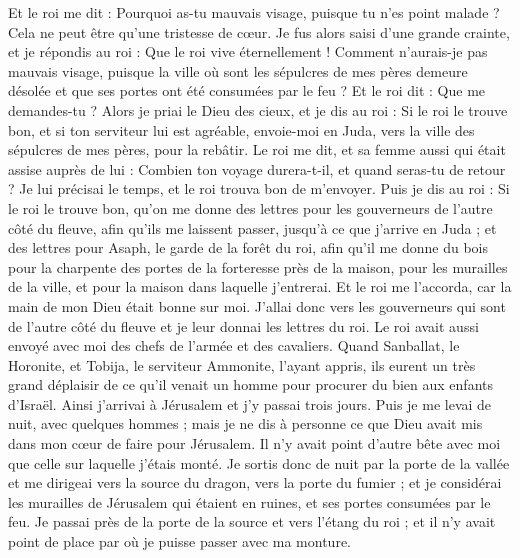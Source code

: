 \begin{multicols}{2}
Et le roi me dit : Pourquoi as-tu mauvais visage, puisque tu n'es point malade ? Cela ne peut être qu'une tristesse de cœur. Je fus alors saisi d'une grande crainte,
et je répondis au roi : Que le roi vive éternellement ! Comment n'aurais-je pas mauvais visage, puisque la ville où sont les sépulcres de mes pères demeure désolée et que ses portes ont été consumées par le feu ?
Et le roi dit : Que me demandes-tu ? Alors je priai le Dieu des cieux,
et je dis au roi : Si le roi le trouve bon, et si ton serviteur lui est agréable, envoie-moi en Juda, vers la ville des sépulcres de mes pères, pour la rebâtir.
Le roi me dit, et sa femme aussi qui était assise auprès de lui : Combien ton voyage durera-t-il, et quand seras-tu de retour ? Je lui précisai le temps, et le roi trouva bon de m'envoyer.
Puis je dis au roi : Si le roi le trouve bon, qu'on me donne des lettres pour les gouverneurs de l'autre côté du fleuve, afin qu'ils me laissent passer, jusqu'à ce que j'arrive en Juda ;
et des lettres pour Asaph, le garde de la forêt du roi, afin qu'il me donne du bois pour la charpente des portes de la forteresse près de la maison, pour les murailles de la ville, et pour la maison dans laquelle j'entrerai. Et le roi me l'accorda, car la main de mon Dieu était bonne sur moi.
J'allai donc vers les gouverneurs qui sont de l'autre côté du fleuve et je leur donnai les lettres du roi. Le roi avait aussi envoyé avec moi des chefs de l'armée et des cavaliers.
Quand Sanballat, le Horonite, et Tobija, le serviteur Ammonite, l'ayant appris, ils eurent un très grand déplaisir de ce qu'il venait un homme pour procurer du bien aux enfants d'Israël.
Ainsi j'arrivai à Jérusalem et j'y passai trois jours.
Puis je me levai de nuit, avec quelques hommes ; mais je ne dis à personne ce que Dieu avait mis dans mon cœur de faire pour Jérusalem. Il n'y avait point d'autre bête avec moi que celle sur laquelle j'étais monté.
Je sortis donc de nuit par la porte de la vallée et me dirigeai vers la source du dragon, vers la porte du fumier ; et je considérai les murailles de Jérusalem qui étaient en ruines, et ses portes consumées par le feu.
Je passai près de la porte de la source et vers l'étang du roi ; et il n'y avait point de place par où je puisse passer avec ma monture.

\end{multicols}
